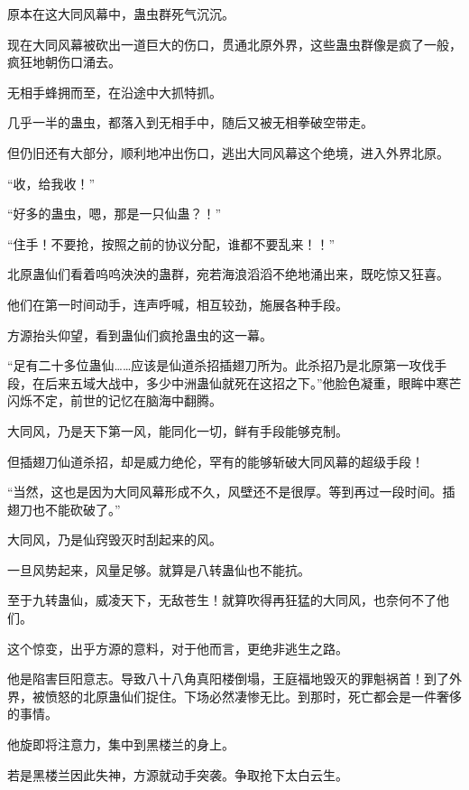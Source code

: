 
\begin{this_body}



原本在这大同风幕中，蛊虫群死气沉沉。

现在大同风幕被砍出一道巨大的伤口，贯通北原外界，这些蛊虫群像是疯了一般，疯狂地朝伤口涌去。

无相手蜂拥而至，在沿途中大抓特抓。

几乎一半的蛊虫，都落入到无相手中，随后又被无相拳破空带走。

但仍旧还有大部分，顺利地冲出伤口，逃出大同风幕这个绝境，进入外界北原。

“收，给我收！”

“好多的蛊虫，嗯，那是一只仙蛊？！”

“住手！不要抢，按照之前的协议分配，谁都不要乱来！！”

北原蛊仙们看着呜呜泱泱的蛊群，宛若海浪滔滔不绝地涌出来，既吃惊又狂喜。

他们在第一时间动手，连声呼喊，相互较劲，施展各种手段。

方源抬头仰望，看到蛊仙们疯抢蛊虫的这一幕。

“足有二十多位蛊仙……应该是仙道杀招插翅刀所为。此杀招乃是北原第一攻伐手段，在后来五域大战中，多少中洲蛊仙就死在这招之下。”他脸色凝重，眼眸中寒芒闪烁不定，前世的记忆在脑海中翻腾。

大同风，乃是天下第一风，能同化一切，鲜有手段能够克制。

但插翅刀仙道杀招，却是威力绝伦，罕有的能够斩破大同风幕的超级手段！

“当然，这也是因为大同风幕形成不久，风壁还不是很厚。等到再过一段时间。插翅刀也不能砍破了。”

大同风，乃是仙窍毁灭时刮起来的风。

一旦风势起来，风量足够。就算是八转蛊仙也不能抗。

至于九转蛊仙，威凌天下，无敌苍生！就算吹得再狂猛的大同风，也奈何不了他们。

这个惊变，出乎方源的意料，对于他而言，更绝非逃生之路。

他是陷害巨阳意志。导致八十八角真阳楼倒塌，王庭福地毁灭的罪魁祸首！到了外界，被愤怒的北原蛊仙们捉住。下场必然凄惨无比。到那时，死亡都会是一件奢侈的事情。

他旋即将注意力，集中到黑楼兰的身上。

若是黑楼兰因此失神，方源就动手突袭。争取抢下太白云生。


\end{this_body}
